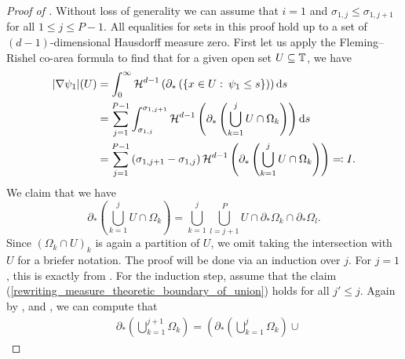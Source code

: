 \begin{proof}[Proof of ]
	Without loss of generality we can assume that $ i = 1 $ and $ \sigma_{ 1, j } \leq \sigma_{ 1, j + 1 } $ for all $ 1 \leq j \leq P - 1 $. 
	All equalities for sets in this proof hold up to a set of $ 
	(d-1)$-dimensional Hausdorff measure zero. First let us apply the 
	Fleming--Rishel co-area formula to find that for a given open set $ U 
	\subseteq \operatorname{\mathbb{T}} $, we have
	\begin{align*}
		\abs{ \nabla \psi_{ 1 } } ( U ) 
		& =
		\int_{ 0 }^{ \infty }
		\operatorname{\mathcal{H}}^{ d - 1 } \left(
		\partial_{ \ast } \left(
		\left\{
		x \in U 
		\, \colon \,
		\psi_{ 1 } \leq s 
		\right\}
		\right)
		\right)
		\dd{ s }
		\\
		& =
		\sum_{ j = 1 }^{ P -1 }
		\int_{ \sigma_{ 1, j } }^{ \sigma_{ 1, j + 1 } }
		\operatorname{\mathcal{H}}^{ d - 1 } \left(
		\partial_{ \ast } \left(
		\bigcup_{ k = 1 }^{ j }
		U \cap \Omega_{ k }
		\right)
		\right)
		\dd{ s }
		\\
		& =
		\sum_{ j = 1 }^{ P - 1 }
		\left(\sigma_{ 1, j +1} - \sigma_{ 1 , j } \right)
		\operatorname{\mathcal{H}}^{ d - 1 } \left(
		\partial_{ \ast } \left(
		\bigcup_{ k = 1 }^{ j }
		U \cap \Omega_{ k }
		\right)
		\right)
		\eqqcolon I. 
	\end{align*}
	We claim that we have
	\begin{equation}
		\label{rewriting_measure_theoretic_boundary_of_union}
		\partial_{ \ast } \left(
		\bigcup_{ k = 1 }^{ j }
		U \cap \Omega_{ k }
		\right)
		=
		\bigcup_{ k = 1 }^{ j }
		\bigcup_{ l = j + 1 }^{ P }
		U
		\cap
		\partial_{ \ast } \Omega_{ k }
		\cap
		\partial_{ \ast } \Omega_{ l }.
	\end{equation}
	Since $ ( \Omega_{ k } \cap U )_{ k } $ is again a partition of $ U $, we 
	omit taking the intersection with $ U $ for a briefer notation. The proof 
	will be done via an induction over $ j $. For $ j = 1 $, this is exactly 
	 from 
	. For the induction step, 
	assume that the claim (\ref{rewriting_measure_theoretic_boundary_of_union}) 
	holds for all $ j' \leq j $. Again by 
	,
	 and , we 
	can compute that
	\begin{align*}
		& \partial_{ \ast } \left(
		\bigcup_{ k = 1 }^{ j + 1 }
		\Omega_{ k }
		\right)
		=
		\left(
		\partial_{ \ast } \left(
		\bigcup_{ k = 1 }^{ j }
		\Omega_{ k }
		\right)
		\cup

\end{align*}
\end{proof}
